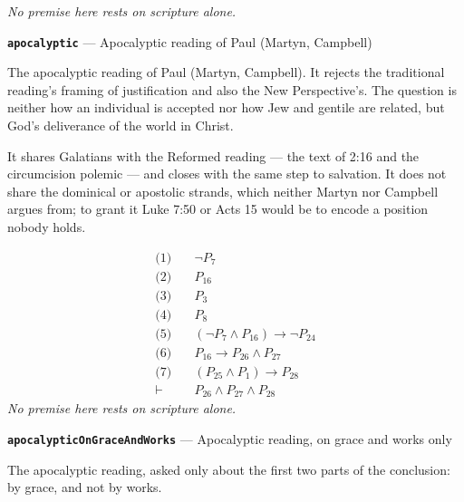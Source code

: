 \documentclass[11pt]{article}
\begin{document}
\emph{No premise here rests on scripture alone.}
\par\medskip\noindent\textbf{\texttt{apocalyptic}} --- Apocalyptic reading of Paul (Martyn, Campbell)\par\nobreak\noindent
The apocalyptic reading of Paul (Martyn, Campbell). It rejects the traditional reading's framing of justification and also the New Perspective's. The question is neither how an individual is accepted nor how Jew and gentile are related, but God's deliverance of the world in Christ.

It shares Galatians with the Reformed reading — the text of 2:16 and the circumcision polemic — and closes with the same step to salvation. It does not share the dominical or apostolic strands, which neither Martyn nor Campbell argues from; to grant it Luke 7:50 or Acts 15 would be to encode a position nobody holds.

\begin{align*}
  \text{(1)} \quad & \lnot P_{7} \\
  \text{(2)} \quad & P_{16} \\
  \text{(3)} \quad & P_{3} \\
  \text{(4)} \quad & P_{8} \\
  \text{(5)} \quad & (\lnot P_{7} \land P_{16}) \rightarrow \lnot P_{24} \\
  \text{(6)} \quad & P_{16} \rightarrow P_{26} \land P_{27} \\
  \text{(7)} \quad & (P_{25} \land P_{1}) \rightarrow P_{28} \\
  \vdash \quad & P_{26} \land P_{27} \land P_{28}
\end{align*}
\emph{No premise here rests on scripture alone.}
\par\medskip\noindent\textbf{\texttt{apocalyptic\allowbreak{}On\allowbreak{}Grace\allowbreak{}And\allowbreak{}Works}} --- Apocalyptic reading, on grace and works only\par\nobreak\noindent
The apocalyptic reading, asked only about the first two parts of the conclusion: by grace, and not by works.
\end{document}
